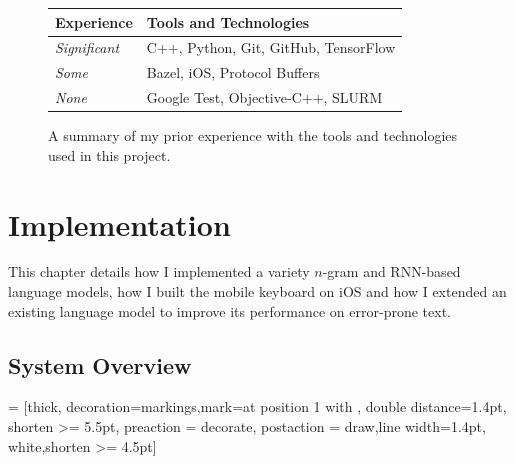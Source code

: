 \documentclass[a4paper, 12pt]{report}
\newcommand{\tbf}[1]{\textbf{#1}}
\newcommand{\tit}[1]{\textit{#1}}
\begin{document}
\begin{figure}[h]
\captionsetup{justification=centering}
\centering
\begin{tabular}{| l | l |}
	\hline
	\tbf{Experience} & \tbf{Tools and Technologies} \\ \hline
	\tit{Significant} & C++, Python, Git, GitHub, TensorFlow \\
	\tit{Some} & Bazel, iOS, Protocol Buffers \\
	\tit{None} & Google Test, Objective-C++, SLURM \\ \hline
\end{tabular}
\caption{A summary of my prior experience with the tools and technologies used in this project.}
\end{figure}

\chapter{Implementation} \label{implementation}

This chapter details how I implemented a variety $n$-gram and RNN-based language models, how I built the mobile keyboard on iOS and how I extended an existing language model to improve its performance on error-prone text.

\section{System Overview}

 = [thick, decoration={markings,mark=at position
	1 with {}},
	double distance=1.4pt, shorten >= 5.5pt,
	preaction = {decorate},
	postaction = {draw,line width=1.4pt, white,shorten >= 4.5pt}]
\end{document}
